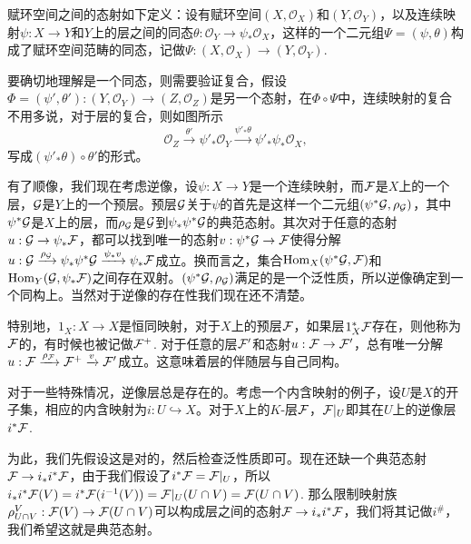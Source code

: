 赋环空间之间的态射如下定义：设有赋环空间$(X,\mathcal{O}_X)$和$(Y,\mathcal{O}_Y)$，以及连续映射$\psi:X\to Y$和$Y$上的层之间的同态$\theta:\mathcal{O}_Y\to \psi_*\mathcal{O}_X$，这样的一个二元组$\Psi=(\psi,\theta)$构成了赋环空间范畴的同态，记做$\Psi:(X,\mathcal{O}_X)\to (Y,\mathcal{O}_Y)$.

要确切地理解是一个同态，则需要验证复合，假设$\Phi=(\psi',\theta'):(Y,\mathcal{O}_Y)\to (Z,\mathcal{O}_Z)$是另一个态射，在$\Phi\circ \Psi$中，连续映射的复合不用多说，对于层的复合，则如图所示
\[
	\mathcal{O}_Z\xrightarrow{\theta'} \psi'_*\mathcal{O}_Y \xrightarrow{\psi'_*\theta} \psi'_*\psi_*\mathcal{O}_X,
\]
写成$(\psi'_*\theta)\circ \theta'$的形式。

\para 有了顺像，我们现在考虑逆像，设$\psi:X\to Y$是一个连续映射，而$\mathcal{F}$是$X$上的一个层，$\mathcal{G}$是$Y$上的一个预层。预层$\mathcal{G}$关于$\psi$的首先是这样一个二元组$(\psi^*\mathcal{G},\rho_{\mathcal{G}})$，其中$\psi^*\mathcal{G}$是$X$上的层，而$\rho_{\mathcal{G}}$是$\mathcal{G}$到$\psi_*\psi^*\mathcal{G}$的典范态射。其次对于任意的态射$u:\mathcal{G} \to \psi_*\mathcal{F}$，都可以找到唯一的态射$v:\psi^*\mathcal{G} \to \mathcal{F}$使得分解$u:\mathcal{G}\xrightarrow{\rho_{\mathcal{G}}} \psi_*\psi^*\mathcal{G} \xrightarrow{\psi_*v} \psi_*\mathcal{F}$成立。换而言之，集合$\operatorname{Hom}_X(\psi^*\mathcal{G},\mathcal{F})$和$\operatorname{Hom}_Y(\mathcal{G},\psi_*\mathcal{F})$之间存在双射。$(\psi^*\mathcal{G},\rho_{\mathcal{G}})$满足的是一个泛性质，所以逆像确定到一个同构上。当然对于逆像的存在性我们现在还不清楚。

特别地，$1_X:X\to X$是恒同映射，对于$X$上的预层$\mathcal{F}$，如果层$1_X^*\mathcal{F}$存在，则他称为$\mathcal{F}$的，有时候也被记做$\mathcal{F}^+$. 对于任意的层$\mathcal{F}'$和态射$u:\mathcal{F}\to\mathcal{F}'$，总有唯一分解$u:\mathcal{F}\xrightarrow{\rho_{\mathcal{F}}} \mathcal{F}^+ \xrightarrow{v} \mathcal{F}'$成立。这意味着层的伴随层与自己同构。

\para 对于一些特殊情况，逆像层总是存在的。考虑一个内含映射的例子，设$U$是$X$的开子集，相应的内含映射为$i:U\hookrightarrow X$。对于$X$上的$K$-层$\mathcal{F}$，$\mathcal{F}|_U$即其在$U$上的逆像层$i^*\mathcal{F}$.

\proof 为此，我们先假设这是对的，然后检查泛性质即可。现在还缺一个典范态射$\mathcal{F}\to i_*i^*\mathcal{F}$，由于我们假设了$i^*\mathcal{F}=\mathcal{F}|_U$，所以$i_*i^*\mathcal{F}(V)=i^*\mathcal{F}(i^{-1}(V))=\mathcal{F}|_U(U\cap V)=\mathcal{F}(U\cap V)$. 那么限制映射族$\rho^V_{U\cap V}:\mathcal{F}(V)\to \mathcal{F}(U\cap V)$可以构成层之间的态射$\mathcal{F}\to i_*i^*\mathcal{F}$，我们将其记做$i^\#$，我们希望这就是典范态射。

